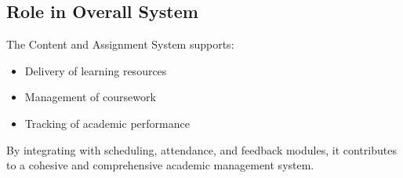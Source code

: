 \subsection{Role in Overall System}

The Content and Assignment System supports:

\begin{itemize}
    \item Delivery of learning resources
    \item Management of coursework
    \item Tracking of academic performance
\end{itemize}

By integrating with scheduling, attendance, and feedback modules, it contributes to a cohesive and
comprehensive academic management system.
